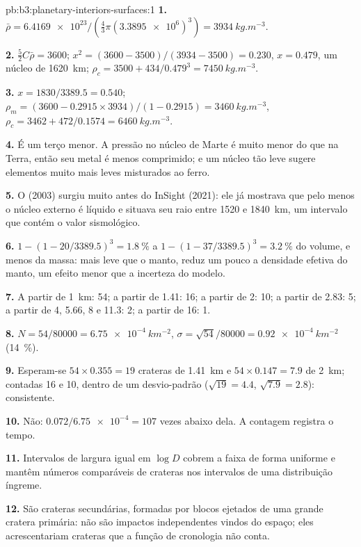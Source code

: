 \begin{solution}{pb:b3:planetary-interiors-surfaces:1}
\textbf{1.} $\bar\rho = \num{6.4169e23}/(\tfrac43\pi(\num{3.3895e6})^3) =
\qty{3934}{kg.m^{-3}}$.

\textbf{2.} $\tfrac52C\bar\rho = 3600$; $x^2 = (3600 - 3500)/(3934 - 3500) =
0.230$, $x = 0.479$, um núcleo de \qty{1620}{km}; $\rho_c = 3500 +
434/0.479^3 = \qty{7450}{kg.m^{-3}}$.

\textbf{3.} $x = 1830/3389.5 = 0.540$; $\rho_m = (3600 - 0.2915\times
3934)/(1 - 0.2915) = \qty{3460}{kg.m^{-3}}$, $\rho_c = 3462 +
472/0.1574 = \qty{6460}{kg.m^{-3}}$.

\textbf{4.} É um terço menor. A pressão no núcleo de Marte é muito
menor do que na Terra, então seu metal é menos comprimido; e um núcleo tão
leve sugere elementos muito mais leves misturados ao ferro.

\textbf{5.} O  (2003) surgiu muito antes do InSight (2021): ele
já mostrava que pelo menos o núcleo externo é líquido e situava seu
raio entre 1520 e \qty{1840}{km}, um intervalo que contém o
valor sismológico.

\textbf{6.} $1 - (1 - 20/3389.5)^3 = \qty{1.8}{\percent}$ a $1 - (1 -
37/3389.5)^3 = \qty{3.2}{\percent}$ do volume, e menos da massa:
mais leve que o manto, reduz um pouco a densidade efetiva do manto,
um efeito menor que a incerteza do modelo.

\textbf{7.} A partir de \qty{1}{km}: 54; a partir de 1.41: 16; a partir de 2: 10; a partir de 2.83: 5;
a partir de 4, 5.66, 8 e 11.3: 2; a partir de 16: 1.

\textbf{8.} $N = 54/80000 = \qty{6.75e-4}{km^{-2}}$, $\sigma = \sqrt{54}/80000
= \qty{0.92e-4}{km^{-2}}$ (\qty{14}{\percent}).

\textbf{9.} Esperam-se $54\times0.355 = 19$ crateras de \qty{1.41}{km} e
$54\times0.147 = 7.9$ de \qty{2}{km}; contadas 16 e 10, dentro de um
desvio-padrão ($\sqrt{19} = 4.4$, $\sqrt{7.9} = 2.8$): consistente.

\textbf{10.} Não: $0.072/\num{6.75e-4} = 107$ vezes abaixo dela. A contagem
registra o tempo.

\textbf{11.} Intervalos de largura igual em $\log D$ cobrem a faixa de forma uniforme e
mantêm números comparáveis de crateras nos intervalos de uma distribuição íngreme.

\textbf{12.} São crateras secundárias, formadas por blocos ejetados de uma
grande cratera primária: não são impactos independentes vindos do espaço; eles acrescentariam
crateras que a função de cronologia não conta.


\end{solution}
